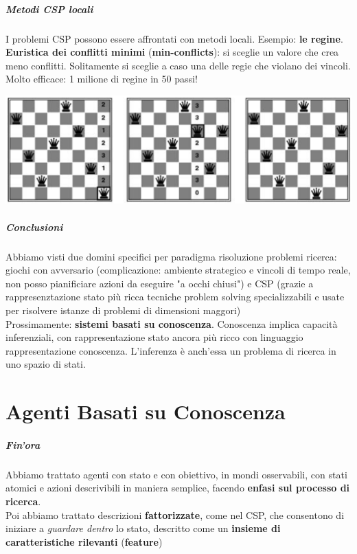 \documentclass[10pt]{book}
\begin{document}
\paragraph{Metodi CSP locali} I problemi CSP possono essere affrontati con metodi locali. Esempio: \textbf{le regine}.\\
\textbf{Euristica dei conflitti minimi} (\textbf{min-conflicts}): si sceglie un valore che crea meno conflitti. Solitamente si sceglie a caso una delle regie che violano dei vincoli.\\
Molto efficace: 1 milione di regine in 50 passi!
\begin{center}
	\includegraphics[scale=0.5]{minconflicts_es.png}
\end{center}
\paragraph{Conclusioni} Abbiamo visti due domini specifici per paradigma risoluzione problemi ricerca: giochi con avversario (complicazione: ambiente strategico e vincoli di tempo reale, non posso pianificiare azioni da eseguire "a occhi chiusi") e CSP (grazie a rappresenztazione stato più ricca tecniche problem solving specializzabili e usate per risolvere istanze di problemi di dimensioni maggori)\\
Prossimamente: \textbf{sistemi basati su conoscenza}. Conoscenza implica capacità inferenziali, con rappresentazione stato ancora più ricco con linguaggio rappresentazione conoscenza. L'inferenza è anch'essa un problema di ricerca in uno spazio di stati.
\chapter{Agenti Basati su Conoscenza}
\paragraph{Fin'ora} Abbiamo trattato agenti con stato e con obiettivo, in mondi osservabili, con stati atomici e azioni descrivibili in maniera semplice, facendo \textbf{enfasi sul processo di ricerca}.\\
Poi abbiamo trattato descrizioni \textbf{fattorizzate}, come nel CSP, che consentono di iniziare a \textit{guardare dentro} lo stato, descritto come un \textbf{insieme di caratteristiche rilevanti} (\textbf{feature})
\end{document}
